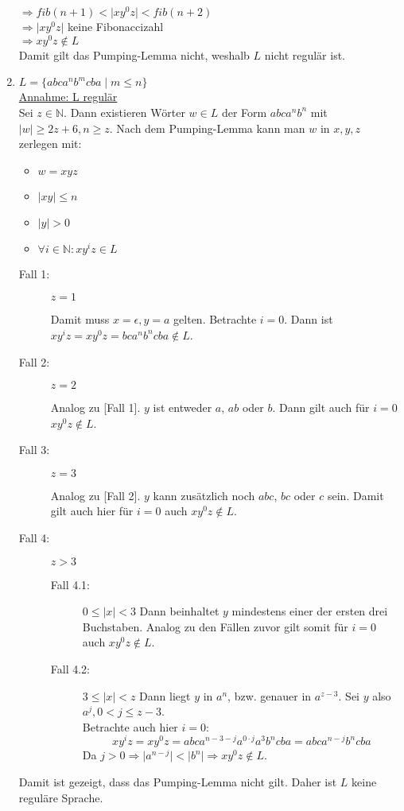 \documentclass[11pt]{article}
\begin{document}
\begin{enumerate}[label=\alph*)]
$\Rightarrow fib(n+1) < \vert xy^0z \vert < fib(n+2)$\\$\Rightarrow \vert xy^0z \vert$ keine Fibonaccizahl\\$\Rightarrow xy^0z \not\in L$\\
Damit gilt das Pumping-Lemma nicht, weshalb $L$ nicht regulär ist.
\item $L=\{abca^nb^mcba\mid m\leq n\}$\\
\underline{Annahme: L regulär}\\
Sei $z\in\mathbb{N}$. Dann existieren Wörter $w\in L$ der Form $abca^nb^n$ mit $\vert w \vert \geq 2z+6, n \geq z$.
Nach dem Pumping-Lemma kann man $w$ in $x,y,z$ zerlegen mit:
\begin{itemize}
\item $w=xyz$
\item $\vert xy \vert \leq n$
\item $\vert y \vert > 0$
\item $\forall i\in\mathbb{N}: xy^{i}z \in L$
\end{itemize}
\begin{description}
\item[Fall 1:] $z=1$\par\nobreak
Damit muss $x=\epsilon, y=a$ gelten. Betrachte $i=0$. Dann ist $xy^iz=xy^0z=bca^nb^ncba\not\in L$.
\item[Fall 2:] $z=2$\par\nobreak
Analog zu [Fall 1]. $y$ ist entweder $a$, $ab$ oder $b$. Dann gilt auch für $i=0$ $xy^0z\not\in L$.
\item[Fall 3:] $z=3$\par\nobreak
Analog zu [Fall 2]. $y$ kann zusätzlich noch $abc$, $bc$ oder $c$ sein. Damit gilt auch hier für $i=0$ auch $xy^0z\not\in L$.
\item[Fall 4:] $z>3$\par\nobreak
\begin{description}
\item[Fall 4.1:] $0\leq \vert x \vert < 3$
Dann beinhaltet $y$ mindestens einer der ersten drei Buchstaben. Analog zu den Fällen zuvor gilt somit für $i=0$ auch $xy^0z\not\in L$.
\item[Fall 4.2:] $3\leq \vert x \vert < z$
Dann liegt $y$ in $a^n$, bzw. genauer in $a^{z-3}$. Sei $y$ also $a^j, 0<j\leq z-3$.\\
Betrachte auch hier $i=0$:
\[xy^iz=xy^0z=abca^{n-3-j}a^{0\cdot j}a^3b^ncba=abca^{n-j}b^ncba\]
Da $j>0 \Rightarrow \vert a^{n-j} \vert < \vert b^n \vert \Rightarrow xy^0z \not\in L$.
\end{description}
\end{description}
Damit ist gezeigt, dass das Pumping-Lemma nicht gilt. Daher ist $L$ keine reguläre Sprache.
\end{enumerate}
\end{document}
